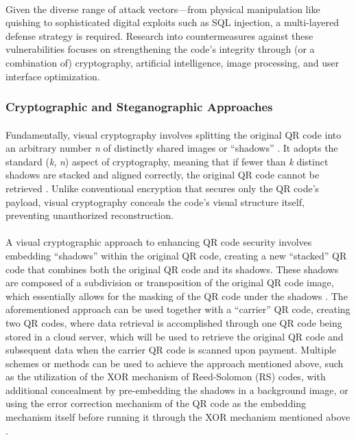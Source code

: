 \documentclass[a4paper]{scl-article}
\begin{document}
\paragraph{}Given the diverse range of attack vectors—from physical manipulation like quishing to sophisticated digital exploits such as SQL injection, a multi-layered defense strategy is required. Research into countermeasures against these vulnerabilities focuses on strengthening the code's integrity through (or a combination of) cryptography, artificial intelligence, image processing, and user interface optimization.

\subsubsection{Cryptographic and Steganographic Approaches}
\label{sect:rrl_3a}
\paragraph{}Fundamentally, visual cryptography involves splitting the original QR code into an arbitrary number \textit{n} of distinctly shared images or “shadows” \cite{bhardwaj2024, naor1995}. It adopts the standard (\textit{k}, \textit{n}) aspect of cryptography, meaning that if fewer than \textit{k} distinct shadows are stacked and aligned correctly, the original QR code cannot be retrieved \cite{ibrahim2021}. Unlike conventional encryption that secures only the QR code’s payload, visual cryptography conceals the code’s visual structure itself, preventing unauthorized reconstruction.

\paragraph{}A visual cryptographic approach to enhancing QR code security involves embedding “shadows” within the original QR code, creating a new “stacked” QR code that combines both the original QR code and its shadows. These shadows are composed of a subdivision or transposition of the original QR code image, which essentially allows for the masking of the QR code under the shadows \cite{li2020}. The aforementioned approach can be used together with a “carrier” QR code, creating two QR codes, where data retrieval is accomplished through one QR code being stored in a cloud server, which will be used to retrieve the original QR code and subsequent data when the carrier QR code is scanned upon payment. Multiple schemes or methods can be used to achieve the approach mentioned above, such as the utilization of the XOR mechanism of Reed-Solomon (RS) codes, with additional concealment by pre-embedding the shadows in a background image, or using the error correction mechanism of the QR code as the embedding mechanism itself before running it through the XOR mechanism mentioned above \cite{lu2017}.
\end{document}
